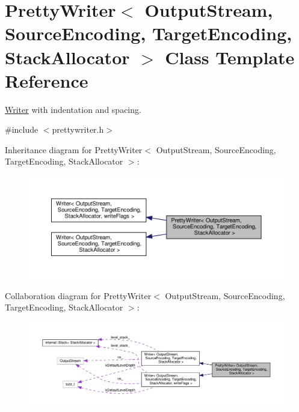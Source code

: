 \hypertarget{classPrettyWriter}{}\section{Pretty\+Writer$<$ Output\+Stream, Source\+Encoding, Target\+Encoding, Stack\+Allocator $>$ Class Template Reference}
\label{classPrettyWriter}


\hyperlink{classWriter}{Writer} with indentation and spacing.  




{\ttfamily \#include $<$prettywriter.\+h$>$}



Inheritance diagram for Pretty\+Writer$<$ Output\+Stream, Source\+Encoding, Target\+Encoding, Stack\+Allocator $>$\+:
\nopagebreak
\begin{figure}[H]
\begin{center}
\leavevmode
\includegraphics[width=350pt]{classPrettyWriter__inherit__graph}
\end{center}
\end{figure}


Collaboration diagram for Pretty\+Writer$<$ Output\+Stream, Source\+Encoding, Target\+Encoding, Stack\+Allocator $>$\+:
\nopagebreak
\begin{figure}[H]
\begin{center}
\leavevmode
\includegraphics[width=350pt]{classPrettyWriter__coll__graph}
\end{center}
\end{figure}

